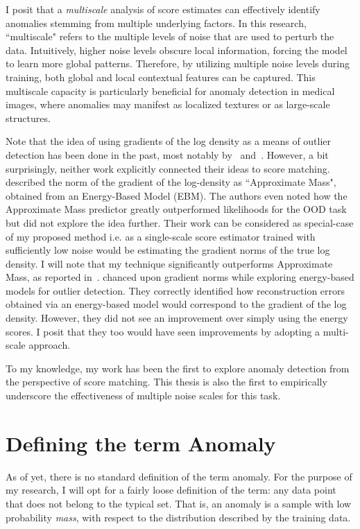 I posit that a \textit{multiscale} analysis of score estimates can effectively identify anomalies stemming from multiple underlying factors. In this research, ``multiscale" refers to the multiple levels of noise that are used to perturb the data. Intuitively, higher noise levels obscure local information, forcing the model to learn more global patterns. Therefore, by utilizing multiple noise levels during training, both global and local contextual features can be captured. This multiscale capacity is particularly beneficial for anomaly detection in medical images, where anomalies may manifest as localized textures or as large-scale structures.


Note that the idea of using gradients of the log density as a means of outlier detection has been done in the past, most notably by~\cite{Grathwohl2020Your} and~\cite{pmlr-v48-zhai16}. However, a bit surprisingly, neither work explicitly connected their ideas to score matching. \cite{Grathwohl2020Your} described the norm of the gradient of the log-density as ``Approximate Mass", obtained from an Energy-Based Model (EBM). The authors even noted how the Approximate Mass predictor greatly outperformed likelihoods for the OOD task but did not explore the idea further. Their work can be considered as special-case of my proposed method i.e. as a single-scale score estimator trained with sufficiently low noise would be estimating the gradient norms of the true log density. I will note that my technique significantly outperforms Approximate Mass, as reported in~\cite{mahmood2021multiscale}. \cite{pmlr-v48-zhai16} chanced upon gradient norms while exploring energy-based models for outlier detection. They correctly identified how reconstruction errors obtained via an energy-based model would correspond to the gradient of the log density. However, they did not see an improvement over simply using the energy scores. I posit that they too would have seen improvements by adopting a multi-scale approach. 

To my knowledge, my work has been the first to explore anomaly detection from the perspective of score matching. This thesis is also the first to empirically underscore the effectiveness of multiple noise scales for this task.


\section{Defining the term Anomaly}
As of yet, there is no standard definition of the term anomaly. 
For the purpose of my research, I will opt for a fairly loose definition of the term: any data point that does not belong to the typical set. That is, an anomaly is a sample with low probability \textit{mass}, with respect to the distribution described by the training data. 

